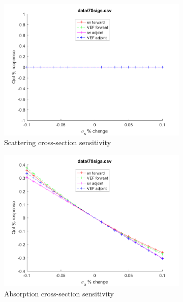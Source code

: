 \documentclass{article}
\begin{document}
\begin{figure}[H]
\begin{subfigure}{.5\textwidth}
  \includegraphics[width=.98\linewidth]{IanProposal/figures2/70sigsSens.png}
  \caption{Scattering cross-section sensitivity}
  \label{fig:sfig2}
\end{subfigure}%
\begin{subfigure}{.5\textwidth}
  \centering
  \includegraphics[width=.98\linewidth]{IanProposal/figures2/70sigaSens.png}
  \caption{Absorption cross-section sensitivity}
  \label{fig:sfig5}
\end{subfigure}%
\caption{}
\label{fig:fig}
\end{figure}
\newpage

\end{document}
